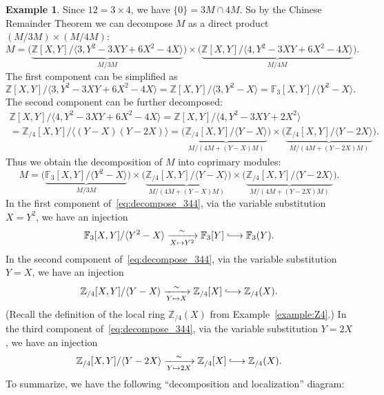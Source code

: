 \documentclass[letterpaper, 11pt, thm-restate]{article}
\numberwithin{equation}{section}
\newcommand{\Z}{\mathbb{Z}}
\newcommand{\F}{\mathbb{F}}
\newcommand{\gen}[1]{\langle {#1} \rangle}
\newcommand{\hooklongrightarrow}{\lhook\joinrel\longrightarrow}
\theoremstyle{definition}
\theoremstyle{definition}
\newtheorem{example}[theorem]{Example}
\theoremstyle{definition}
\begin{document}
\begin{example}
    Since $12 = 3 \times 4$, we have $\{0\} = 3M \cap 4M$.
    So by the Chinese Remainder Theorem we can decompose $M$ as a direct product $(M/3M) \times (M/4M)$:
    \[
    M = \Big(\underbrace{\Z[X, Y]/\gen{3, Y^2-3XY+6X^2-4X}}_{M/3M}\Big) \times \Big(\underbrace{\Z[X, Y]/\gen{4, Y^2-3XY+6X^2-4X}}_{M/4M}\Big).
    \]
    The first component can be simplified as 
    \[
    \Z[X, Y]/\gen{3, Y^2-3XY+6X^2-4X} = \Z[X, Y]/\gen{3, Y^2-X} = \F_3[X, Y]/\gen{Y^2-X}.
    \]
    The second component can be further decomposed:
    \begin{multline*}
        \Z[X, Y]/\gen{4, Y^2-3XY+6X^2-4X} = \Z[X, Y]/\gen{4, Y^2-3XY + 2X^2} \\
        = \Z_{/4}[X, Y]/\gen{(Y-X)(Y-2X)}
        = \Big(\underbrace{\Z_{/4}[X, Y]/\gen{Y-X}}_{M/(4M+(Y-X)M)}\Big) \times \Big(\underbrace{\Z_{/4}[X, Y]/\gen{Y-2X}}_{M/(4M+(Y-2X)M)}\Big).
    \end{multline*}
    Thus we obtain the decomposition of $M$ into coprimary modules:
    \begin{equation}\label{eq:decompose_344}
    M = \Big(\underbrace{\F_3[X, Y]/\gen{Y^2-X}}_{M/3M}\Big) \times \Big(\underbrace{\Z_{/4}[X, Y]/\gen{Y-X}}_{M/(4M+(Y-X)M)}\Big) \times \Big(\underbrace{\Z_{/4}[X, Y]/\gen{Y-2X}}_{M/(4M+(Y-2X)M)}\Big).
    \end{equation}
    In the first component of~\eqref{eq:decompose_344}, via the variable substitution $X = Y^2$, we have an injection
    \begin{equation}\label{eq:inject_1}
    \F_3[X, Y]/\gen{Y^2-X} \xrightarrow[X \mapsto Y^2]{\sim} \F_3[Y] \hooklongrightarrow \F_3(Y).
    \end{equation}
    In the second component of~\eqref{eq:decompose_344}, via the variable substitution $Y = X$, we have an injection
    \begin{equation}\label{eq:inject_2}
    \Z_{/4}[X, Y]/\gen{Y-X} \xrightarrow[Y \mapsto X]{\sim} \Z_{/4}[X] \hooklongrightarrow \Z_{/4}(X).
    \end{equation}
    (Recall the definition of the local ring $\Z_{/4}(X)$ from Example~\ref{example:Z4}.)
    In the third component of~\eqref{eq:decompose_344}, via the variable substitution $Y = 2X$, we have an injection 
    \begin{equation}\label{eq:inject_3}
    \Z_{/4}[X, Y]/\gen{Y-2X} \xrightarrow[Y \mapsto 2X]{\sim} \Z_{/4}[X] \hooklongrightarrow \Z_{/4}(X).
    \end{equation}
    To summarize, we have the following ``decomposition and localization'' diagram:

\end{example}
\end{document}
